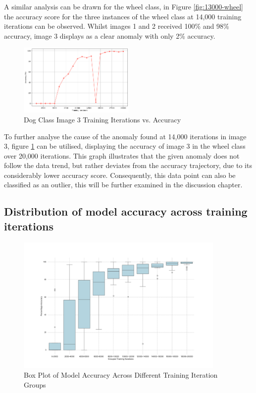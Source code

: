 A similar analysis can be drawn for the wheel class, in Figure \ref{fig:13000-wheel} the accuracy score for the three instances of the wheel class at 14,000 training iterations can be observed. Whilst images 1 and 2 received 100\% and 98\% accuracy, image 3 displays as a clear anomaly with only 2\% accuracy. 


\begin{figure}[h]
   \centering
   \includegraphics[width=0.5\textwidth]{../Data/wheel_image1_accuracy_vs_iteration.png}
   \caption{Dog Class Image 3 Training Iterations vs. Accuracy }
   \label{fig:image-3-accuracy}
\end{figure}

To further analyse the cause of the anomaly found at 14,000 iterations in image 3, figure \ref{fig:image-3-accuracy} can be utilised, displaying the accuracy of image 3 in the wheel class over 20,000 iterations. This graph illustrates that the given anomaly does not follow the data trend, but rather deviates from the accuracy trajectory, due to its considerably lower accuracy score. Consequently, this data point can also be classified as an outlier, this will be further examined in the discussion chapter. \\
\newpage


\subsection{Distribution of model accuracy across training iterations}

\begin{figure}[h]
   \centering
   \includegraphics[width=0.9\textwidth]{../Data/box_plot_iteration_vs_accuracy.png}
   \caption{Box Plot of Model Accuracy Across Different Training Iteration Groups}
   \label{fig:Box-plot}
\end{figure}


